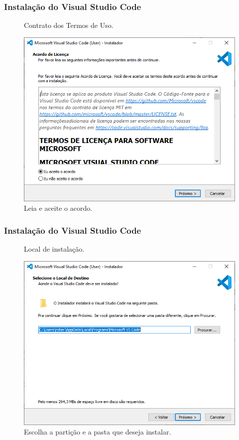 \documentclass[brazilian]{beamer}
\begin{document}
\begin{frame}
    \frametitle{Instalação do Visual Studio Code}
    \begin{figure}[h]
        \centering
        \caption{Contrato dos Termos de Uso.}
        \label{fig:contrato}
        \includegraphics[width=0.8\textheight]{../images/contrato.png}
        \caption*{\footnotesize Leia e aceite o acordo.}
    \end{figure}
\end{frame}

\begin{frame}
    \frametitle{Instalação do Visual Studio Code}
    \begin{figure}[h]
        \centering
        \caption{Local de instalação.}
        \label{fig:local}
        \includegraphics[width=0.8\textheight]{../images/local.png}
        \caption*{\footnotesize Escolha a partição e a pasta que deseja instalar.}
    \end{figure}
\end{frame}
\end{document}
